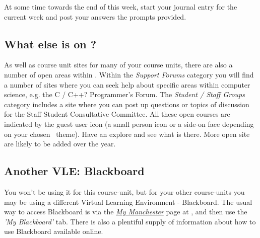 At some time towards the end of this week, start your journal entry for the current week and post your answers the prompts provided.

\subsection{What else is on \moodle?}
\label{sec:what-else-moodle}


As well as course unit sites for many of your course units, there are also a number of open areas within \moodle. Within the \emph{Support Forums} category you will find a number of sites where you can seek help about specific areas within computer science, e.g. the C / C++? Programmer's Forum. The \emph{Student / Staff Groups} category includes a site where you can post up questions or topics of discussion for the Staff Student Consultative Committee. All these open courses are indicated by the guest user icon (a small person icon or a side-on face depending on your chosen \moodle\ theme). Have an explore and see what is there. More open site are likely to be added over the year.









\subsection{Another VLE: Blackboard}
\label{sec:blackboard}

You won't be using it for this course-unit, but for your other course-units you may be using a different Virtual Learning Environment - \textsf{Blackboard}. The usual way to access \textsf{Blackboard} is via the \href{https://my.manchester.ac.uk}{\emph{My Manchester}} page at , and then use the \emph{'My Blackboard'} tab. There is also a plentiful supply of information about how to use Blackboard available online.


